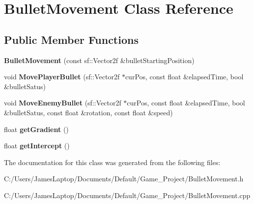 \hypertarget{class_bullet_movement}{}\section{Bullet\+Movement Class Reference}
\label{class_bullet_movement}
\subsection*{Public Member Functions}
\begin{DoxyCompactItemize}
\item 
\mbox{\label{class_bullet_movement_a828d99972323657caf3dafa00e3a9e5e}} 
{\bfseries Bullet\+Movement} (const sf\+::\+Vector2f \&bullet\+Starting\+Position)
\item 
\mbox{\label{class_bullet_movement_a33b6ad498331352d366e2dab6bc2c712}} 
void {\bfseries Move\+Player\+Bullet} (sf\+::\+Vector2f $\ast$cur\+Pos, const float \&elapsed\+Time, bool \&bullet\+Satus)
\item 
\mbox{\label{class_bullet_movement_ae7109a6098374d23e8dc2360d6546b7c}} 
void {\bfseries Move\+Enemy\+Bullet} (sf\+::\+Vector2f $\ast$cur\+Pos, const float \&elapsed\+Time, bool \&bullet\+Satus, const float \&rotation, const float \&speed)
\item 
\mbox{\label{class_bullet_movement_a4dddd135a0d89dbb8d7b4ec076264f16}} 
float {\bfseries get\+Gradient} ()
\item 
\mbox{\label{class_bullet_movement_ab9716be6fffd1b7f58e5b3be24062e5b}} 
float {\bfseries get\+Intercept} ()
\end{DoxyCompactItemize}


The documentation for this class was generated from the following files\+:\begin{DoxyCompactItemize}
\item 
C\+:/\+Users/\+James\+Laptop/\+Documents/\+Default/\+Game\+\_\+\+Project/Bullet\+Movement.\+h\item 
C\+:/\+Users/\+James\+Laptop/\+Documents/\+Default/\+Game\+\_\+\+Project/Bullet\+Movement.\+cpp\end{DoxyCompactItemize}

